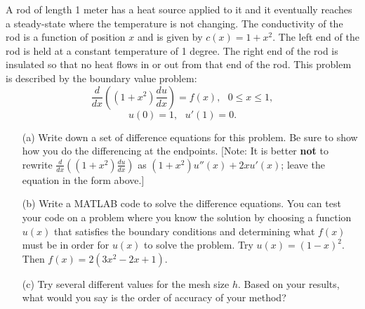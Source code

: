 \documentclass[10pt]{article}
\begin{document}
\begin{solution}[Solution]
\end{solution}

\begin{problem}[Problem 6]
A rod of length 1 meter has a heat source applied to it and it eventually reaches a steady-state where the temperature is not changing.  The conductivity of the rod is a function of position \(x\) and is given by \(c(x) = 1 + x^2\).  The left end of the rod is held at a constant temperature of 1 degree.  The right end of the rod is insulated so that no heat flows in or out from that end of the rod.  This problem is described by the boundary value problem:
\[ \frac{d}{dx} \left( (1 + x^2 ) \frac{du}{dx} \right) = f(x) ,~~~ 
0 \leq x \leq 1 , \]
\[ u(0) = 1,~~~u'(1) = 0 . \]
\begin{enumerate}
\item[(a)] Write down a set of difference equations for this problem.
Be sure to show how you do the differencing at the endpoints.
[Note:  It is better {\bf not} to rewrite 
\(\frac{d}{dx} ( ( 1+ x^2 ) \frac{du}{dx} )\) as \((1 + x^2 ) u'' (x) + 2x u'(x)\);
leave the equation in the form above.]
\item[(b)] Write a MATLAB code to solve the difference equations. You can test your code on a problem where you know the solution by choosing a function \(u(x)\) that satisfies the boundary conditions and determining what \(f(x)\) must be in order for \(u(x)\) to solve the problem.  Try \(u(x) = (1-x )^2\).  Then \(f(x) = 2( 3 x^2 - 2 x + 1 )\). 
\item[(c)] Try several different values for the mesh size \(h\).  Based on your results, what would you say is the order of accuracy of your method?
\end{enumerate}
\end{problem}
\end{document}
